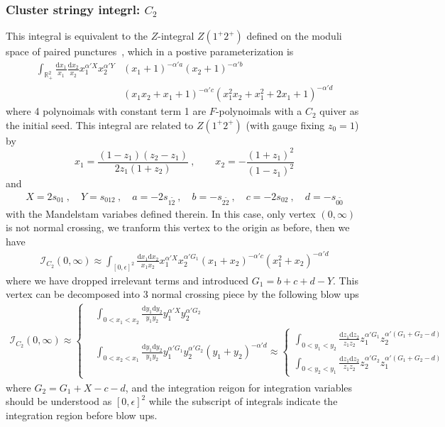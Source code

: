 \documentclass[12pt]{article}
\theoremstyle{definition}
\theoremstyle{plain}
\newcommand{\dif}{\mathrm{d}} %
\begin{document}
\subsubsection*{Cluster stringy integrl: $C_2$}
This integral is equivalent to the $Z$-integral $Z(1^{+}2^{+})$ defined on the moduli space of paired punctures~\cite{}, which in a postive parameterization is 
\begin{align*}
\int_{\mathbb R_+^2} \frac{\dif x_1}{x_1}\frac{\dif x_2}{x_2}x_1^{\alpha' X}x_2^{\alpha' Y}
&(x_1 + 1)^{-\alpha' a} 
(x_2 + 1)^{-\alpha' b}\\
&(x_1x_2 + x_1 + 1)^{-\alpha' c}
(x_1^2x_2 + x_1^2 + 2x_1 + 1)^{-\alpha' d} 
\end{align*}
where 4 polynoimals with constant term 1 are $F$-polynoimals with a $C_{2}$ quiver as the initial seed.
This integral are related to $Z(1^{+}2^{+})$ (with gauge fixing $z_{0}=1$) by 
\begin{equation*}
	x_{1}=\frac{(1-z_{1})(z_{2}-z_{1})}{2z_{1}(1+z_{2})} \:,\qquad x_{2}=-\frac{(1+z_{1})^{2}}{(1-z_{1})^{2}}
\end{equation*}
and
\begin{align*}
	X=2s_{01}\:,\quad Y=s_{012}\:,\quad a=-2s_{1\tilde{2}}\:,\quad b=-s_{2\tilde{2}}\:,\quad 
	c=-2s_{02}\:,\quad d=-s_{0\tilde{0}}
\end{align*}
with the Mandelstam variabes defined therein. In this case, only vertex $(0,\infty)$ is not normal crossing, we tranform this vertex to the origin as before, then we have
\begin{align*}
	\mathcal{I}_{C_{2}}(0,\infty)\approx \int_{[0,\epsilon]^{2}} \frac{\dif x_{1}\dif x_{2}}{x_{1}x_{2}} x_{1}^{\alpha' X}x_{2}^{\alpha' G_{1}}
	(x_{1}+x_{2})^{-\alpha' c} (x_{1}^{2}+x_{2})^{-\alpha' d}
\end{align*}
where we have dropped irrelevant terms and introduced $G_{1}=b+c+d-Y$. This vertex can be decomposed into 3 normal crossing piece by the following blow ups
\begin{align*}
	\mathcal{I}_{C_{2}}(0,\infty)\approx\left\{
	\begin{aligned}
		&\int_{0<x_{1}<x_{2}}\frac{\dif y_{1}\dif y_{2}}{y_{1}y_{2}} y_{1}^{\alpha' X}y_{2}^{\alpha' G_{2}} \\
		&\int_{0<x_{2}<x_{1}}\frac{\dif y_{1}\dif y_{2}}{y_{1}y_{2}} y_{1}^{\alpha' G_{1}}y_{2}^{\alpha' G_{2}}(y_{1}+y_{2})^{-\alpha'd} \approx
		\left\{\begin{aligned}
			\int_{0<y_{1}<y_{2}}\frac{\dif z_{1} \dif z_{2}}{z_{1}z_{2}}z_{1}^{\alpha' G_{1}}
			z_{2}^{\alpha'(G_{1}+G_{2}-d)} \\
			\int_{0<y_{2}<y_{1}}\frac{\dif z_{1}\dif z_{2}}{z_{1}z_{2}} z_{2}^{\alpha' G_{2}}
			z_{1}^{\alpha'(G_{1}+G_{2}-d)}
		\end{aligned} \right. 
	\end{aligned} \right.
\end{align*}
where $G_{2}=G_{1}+X-c-d$, and the integration reigon for integration variables should be understood as $[0,\epsilon]^{2}$ while the subscript of integrals indicate the integration region before blow ups.
\end{document}
